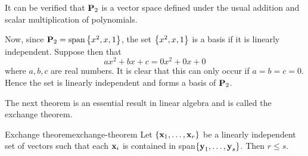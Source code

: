 \begin{solution}
  It can be verified that $\mathbf{P}_2$ is a vector space defined under
  the usual addition and scalar multiplication of polynomials.

  Now, since $\Poly_2=\sspan\set{x^{2},x, 1}$, the set
  $\left\{x^{2}, x, 1\right\} $ is a basis if it is linearly
  independent. Suppose then that
  \begin{equation*}
    ax^{2}+bx+c=0x^2 + 0x + 0
  \end{equation*}
  where $a,b,c$ are real numbers. It is clear that this can only occur
  if $a=b=c=0$. Hence the set is linearly independent and forms a
  basis of $\mathbf{P}_2$.
\end{solution}

The next theorem is an essential result in linear algebra and is
called the exchange theorem.

\begin{theorem}{Exchange theorem}{exchange-theorem}
  Let $\left\{\mbox{\bf x}_{1},\ldots,\mbox{\bf x}_{r}\right\} $ be a linearly
  independent set of vectors such that each $\mbox{\bf x}_{i}$ is
  contained in span$\left\{\mbox{\bf y}_{1},\ldots,\mbox{\bf y}_{s}\right\}$. Then
  $ r\leq s$.
\end{theorem}

